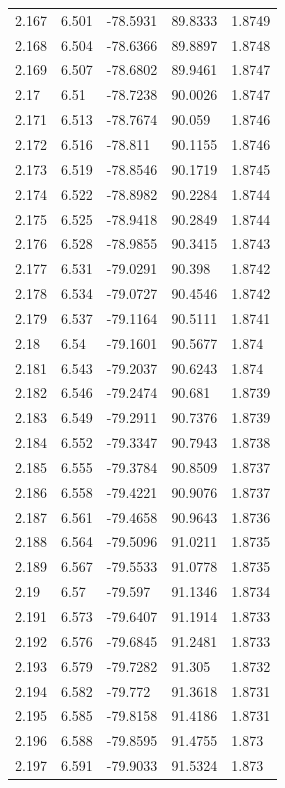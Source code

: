 \begin{tabular}{lllll}
2.167 & 6.501 & -78.5931 & 89.8333 & 1.8749 \\
2.168 & 6.504 & -78.6366 & 89.8897 & 1.8748 \\
2.169 & 6.507 & -78.6802 & 89.9461 & 1.8747 \\
2.17 & 6.51 & -78.7238 & 90.0026 & 1.8747 \\
2.171 & 6.513 & -78.7674 & 90.059 & 1.8746 \\
2.172 & 6.516 & -78.811 & 90.1155 & 1.8746 \\
2.173 & 6.519 & -78.8546 & 90.1719 & 1.8745 \\
2.174 & 6.522 & -78.8982 & 90.2284 & 1.8744 \\
2.175 & 6.525 & -78.9418 & 90.2849 & 1.8744 \\
2.176 & 6.528 & -78.9855 & 90.3415 & 1.8743 \\
2.177 & 6.531 & -79.0291 & 90.398 & 1.8742 \\
2.178 & 6.534 & -79.0727 & 90.4546 & 1.8742 \\
2.179 & 6.537 & -79.1164 & 90.5111 & 1.8741 \\
2.18 & 6.54 & -79.1601 & 90.5677 & 1.874 \\
2.181 & 6.543 & -79.2037 & 90.6243 & 1.874 \\
2.182 & 6.546 & -79.2474 & 90.681 & 1.8739 \\
2.183 & 6.549 & -79.2911 & 90.7376 & 1.8739 \\
2.184 & 6.552 & -79.3347 & 90.7943 & 1.8738 \\
2.185 & 6.555 & -79.3784 & 90.8509 & 1.8737 \\
2.186 & 6.558 & -79.4221 & 90.9076 & 1.8737 \\
2.187 & 6.561 & -79.4658 & 90.9643 & 1.8736 \\
2.188 & 6.564 & -79.5096 & 91.0211 & 1.8735 \\
2.189 & 6.567 & -79.5533 & 91.0778 & 1.8735 \\
2.19 & 6.57 & -79.597 & 91.1346 & 1.8734 \\
2.191 & 6.573 & -79.6407 & 91.1914 & 1.8733 \\
2.192 & 6.576 & -79.6845 & 91.2481 & 1.8733 \\
2.193 & 6.579 & -79.7282 & 91.305 & 1.8732 \\
2.194 & 6.582 & -79.772 & 91.3618 & 1.8731 \\
2.195 & 6.585 & -79.8158 & 91.4186 & 1.8731 \\
2.196 & 6.588 & -79.8595 & 91.4755 & 1.873 \\
2.197 & 6.591 & -79.9033 & 91.5324 & 1.873 \\

\end{tabular}
